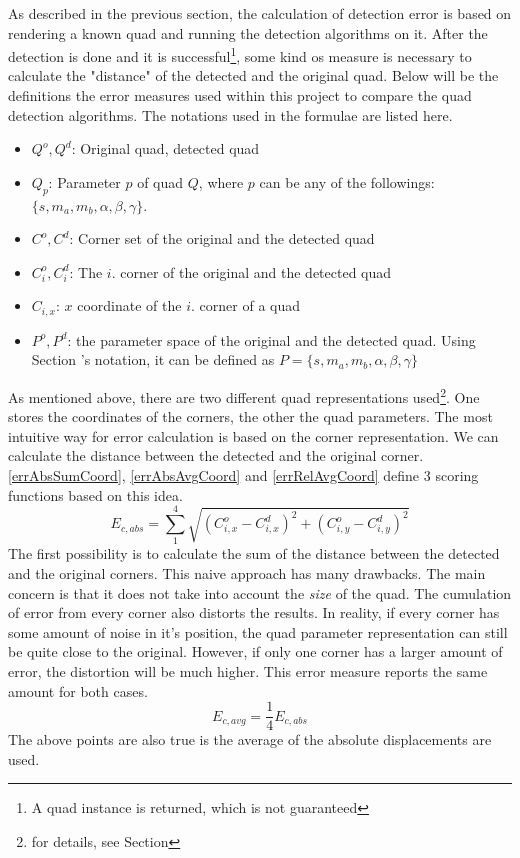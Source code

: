 As described in the previous section, the calculation of detection error is based on rendering a known quad and running the detection algorithms on it.
After the detection is done and it is successful\footnote{A quad instance is returned, which is not guaranteed}, some kind os measure is necessary to calculate the "distance" of the detected and the original quad.
Below will be the definitions the error measures used within this project to compare the quad detection algorithms.
The notations used in the formulae are listed here.
\begin{itemize}
	\item $Q^o, Q^d$: Original quad, detected quad
	\item $Q_p$: Parameter $p$ of quad $Q$, where $p$ can be any of the followings: $\{s, m_a, m_b, \alpha, \beta, \gamma\}$. 
	\item $C^o, C^d$: Corner set of the original and the detected quad
	\item $C_i^o, C_i^d$: The $i.$ corner of the original and the detected quad
	\item $C_{i,x}$: $x$ coordinate of the $i.$ corner of a quad
	\item $P^o, P^d$: the parameter space of the original and the detected quad. Using Section 's notation, it can be defined as $P = \{s, m_a, m_b, \alpha, \beta, \gamma\}$
\end{itemize}

As mentioned above, there are two different quad representations used\footnote{for details, see Section }.
One stores the coordinates of the corners, the other the quad parameters.
The most intuitive way for error calculation is based on the corner representation.
We can calculate the distance between the detected and the original corner.
\eqref{errAbsSumCoord}, \eqref{errAbsAvgCoord} and \eqref{errRelAvgCoord} define 3 scoring functions based on this idea. 
\begin{equation}
E_{c,abs} = \sum_{1}^{4} \sqrt{(C_{i,x}^o - C_{i,x}^d)^2 + (C_{i,y}^o - C_{i,y}^d)^2}
\label{eq:errAbsSumCoord}
\end{equation}
The first possibility is to calculate the sum of the distance between the detected and the original corners.
This naive approach has many drawbacks.
The main concern is that it does not take into account the \textit{size} of the quad.
The cumulation of error from every corner also distorts the results.
In reality, if every corner has some amount of noise in it's position, the quad parameter representation can still be quite close to the original.
However, if only one corner has a larger amount of error, the distortion will be much higher.
This error measure reports the same amount for both cases.
\begin{equation}
E_{c,avg} = \frac{1}{4} E_{c,abs}
\label{eq:errAbsAvgCoord}
\end{equation}
The above points are also true is the average of the absolute displacements are used.

